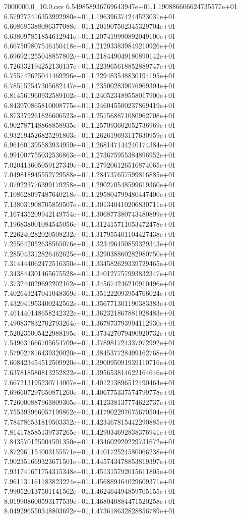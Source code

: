 \begin{filecontents*}{7000000.0_10.0.csv}
6.549858936769643947e+01,1.190886606624735577e+01
6.579272416353992980e+01,1.196396374244523031e+01
6.608685388086377088e+01,1.201907502345329704e+01
6.638097851854612941e+01,1.207419990892049100e+01
6.667509807546450418e+01,1.212933839849210926e+01
6.696921255048857802e+01,1.218449049180890142e+01
6.726332194252130137e+01,1.223965618852889747e+01
6.755742625041469296e+01,1.229483548830194195e+01
6.785152547305682447e+01,1.235002839076969394e+01
6.814561960932589102e+01,1.240523489558017900e+01
6.843970865810008775e+01,1.246045500237869419e+01
6.873379261826606523e+01,1.251568871080962708e+01
6.902787148868858935e+01,1.257093602052736969e+01
6.932194526825291803e+01,1.262619693117630959e+01
6.961601395583934959e+01,1.268147144240174384e+01
6.991007755032536863e+01,1.273675955384896952e+01
7.020413605059127349e+01,1.279206126516874065e+01
7.049818945552729588e+01,1.284737657599816885e+01
7.079223776399179258e+01,1.290270548599619360e+01
7.108628097487640218e+01,1.295804799480447400e+01
7.138031908705859507e+01,1.301340410206830711e+01
7.167435209942149754e+01,1.306877380743480899e+01
7.196838001084545056e+01,1.312415711053472478e+01
7.226240282020508232e+01,1.317955401104427438e+01
7.255642052638565076e+01,1.323496450859329343e+01
7.285043312826462625e+01,1.329038860282980750e+01
7.314444062472516350e+01,1.334582629339729465e+01
7.343844301465675528e+01,1.340127757993832347e+01
7.373244029692202162e+01,1.345674246210910496e+01
7.402643247041048369e+01,1.351222093954766024e+01
7.432041953400242562e+01,1.356771301190383383e+01
7.461440148658242322e+01,1.362321867881928483e+01
7.490837832702793264e+01,1.367873793994112930e+01
7.520235005422988195e+01,1.373427079490920732e+01
7.549631666705654709e+01,1.378981724337972992e+01
7.579027816439320020e+01,1.384537728499162768e+01
7.608423454512509920e+01,1.390095091939110716e+01
7.637818580813252822e+01,1.395653814622164646e+01
7.667213195230714007e+01,1.401213896512490464e+01
7.696607297650871260e+01,1.406775337574799778e+01
7.726000887963809305e+01,1.412338137774622737e+01
7.755393966057199862e+01,1.417902297075670504e+01
7.784786531819503352e+01,1.423467815442290885e+01
7.814178585139737265e+01,1.429034692838376941e+01
7.843570125904591350e+01,1.434602929229731672e+01
7.872961154003155571e+01,1.440172524580066238e+01
7.902351669323671501e+01,1.445743478853819397e+01
7.931741671754315348e+01,1.451315792015611805e+01
7.961131161183823224e+01,1.456889464029609371e+01
7.990520137501141562e+01,1.462464494859705155e+01
8.019908600593177539e+01,1.468040884471520258e+01
8.049296550348803692e+01,1.473618632828856789e+01

\end{filecontents*}
